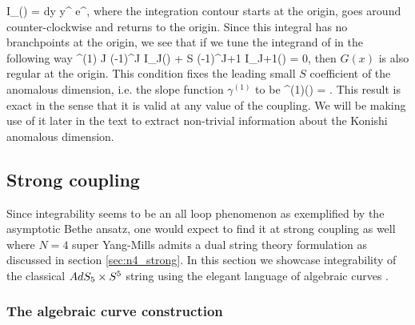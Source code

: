 \beq
	I_\nu(\Lambda) =  \oint dy \; y^{} e^{\Lambda {}},
\eeq
where the integration contour starts at the origin, goes around counter-clockwise and returns to the origin. 
Since this integral has no branchpoints at the origin, we see that if we tune the integrand of  in the following way
\beq
	\gamma^{(1)} J (-1)^J I_J(\Lambda) + \Lambda S (-1)^{J+1} I_{J+1}(\Lambda) = 0,
\eeq
then $G(x)$ is also regular at the origin. 
This condition fixes the leading small $S$ coefficient of the anomalous dimension, i.e. the slope function $\gamma^{(1)}$ to be
\beq
	\label{eq:slope_function}
	\gamma^{(1)}(\Lambda) =  .
\eeq
This result is exact in the sense that it is valid at any value of the coupling.
We will be making use of it later in the text to extract non-trivial information about the Konishi anomalous dimension.

\subsection{Strong coupling}
\label{sec:integrability_strong}

Since integrability seems to be an all loop phenomenon as exemplified by the asymptotic Bethe ansatz, one would expect to find it at strong coupling as well where $N=4$ super Yang-Mills admits a dual string theory formulation as discussed in section \ref{sec:n4_strong}. 
In this section we showcase integrability of the classical $AdS_5 \times S^5$ string using the elegant language of algebraic curves \cite{Kazakov:2004qf,Beisert:2005bm}. 

\subsubsection{The algebraic curve construction}
\label{sec:spectral_curve}


